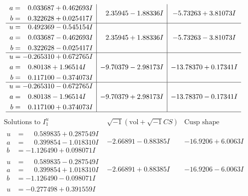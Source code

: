 \documentclass[1p]{elsarticle_modified}
\theoremstyle{definition}
\newcommand{\I}{\sqrt{-1}}
\begin{document}
$$\begin{array}{c|c|c}
\begin{aligned}
a &= \phantom{-}0.033687 + 0.462693 I \\
b &= \phantom{-}0.322628 + 0.025417 I\end{aligned}
 & \phantom{-}2.35945 - 1.88336 I & -5.73263 + 3.81073 I \\ \hline\begin{aligned}
u &= \phantom{-}0.492369 - 0.545154 I \\
a &= \phantom{-}0.033687 - 0.462693 I \\
b &= \phantom{-}0.322628 - 0.025417 I\end{aligned}
 & \phantom{-}2.35945 + 1.88336 I & -5.73263 - 3.81073 I \\ \hline\begin{aligned}
u &= -0.265310 + 0.672765 I \\
a &= \phantom{-}0.80138 + 1.96514 I \\
b &= \phantom{-}0.117100 - 0.374073 I\end{aligned}
 & -9.70379 - 2.98173 I & -13.78370 + 0.17341 I \\ \hline\begin{aligned}
u &= -0.265310 - 0.672765 I \\
a &= \phantom{-}0.80138 - 1.96514 I \\
b &= \phantom{-}0.117100 + 0.374073 I\end{aligned}
 & -9.70379 + 2.98173 I & -13.78370 - 0.17341 I\\
 \hline 
 \end{array}$$\newpage$$\begin{array}{c|c|c}  
\text{Solutions to }I^u_{1}& \I (\text{vol} + \sqrt{-1}CS) & \text{Cusp shape}\\
 \hline 
\begin{aligned}
u &= \phantom{-}0.589835 + 0.287549 I \\
a &= \phantom{-}0.399854 - 1.018310 I \\
b &= -1.126490 + 0.098071 I\end{aligned}
 & -2.66891 - 0.88385 I & -16.9206 + 6.0063 I \\ \hline\begin{aligned}
u &= \phantom{-}0.589835 - 0.287549 I \\
a &= \phantom{-}0.399854 + 1.018310 I \\
b &= -1.126490 - 0.098071 I\end{aligned}
 & -2.66891 + 0.88385 I & -16.9206 - 6.0063 I \\ \hline\begin{aligned}
u &= -0.277498 + 0.391559 I \\

\end{aligned}
\end{array}$$
\end{document}
